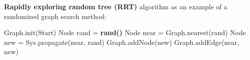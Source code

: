\documentclass[landscape]{article}
\newcommand{\vamspace}{\vspace{-3pt}}
\newcommand{\vpspace}{\vspace{5pt}}
\begin{document}
\begin{multicols}{3}
\vpspace

\begin{minipage}{\columnwidth}
  \textbf{Rapidly exploring random tree (RRT)} algorithm as an example of a
  randomized graph search method:

  \vamspace

  \begin{algorithm}[H]
    \DontPrintSemicolon
    Graph.init(Start)\;
    {
      Node rand = \textbf{rand()}\;
      Node near = Graph.nearest(rand)\;
      \For{}
      {
        Node new = Sys.propagate(near, rand)\;
        Graph.addNode(new)\;
        Graph.addEdge(near, new)\;
      }
    }
  \end{algorithm}


\end{minipage}





\end{multicols}
\end{document}
